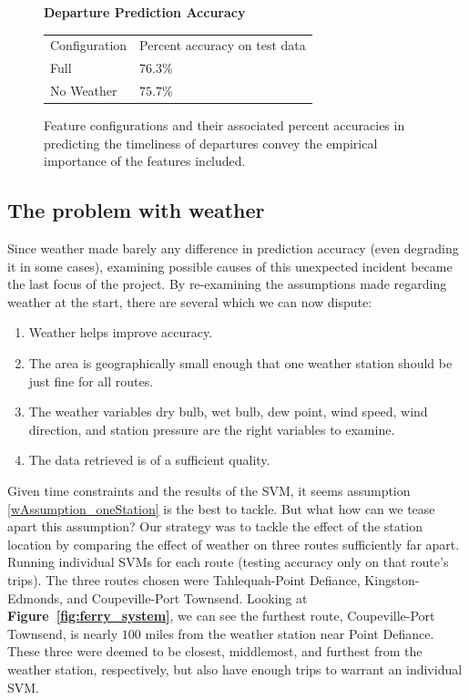 \documentclass[11pt]{article} %
\begin{document}
\begin{figure}
    \centering
    \textbf{Departure Prediction Accuracy}

    \begin{tabular}{ll}
        Configuration & Percent accuracy on test data\\
        Full        & $76.3\%$\\
        No Weather  & $75.7\%$\\
    \end{tabular}
    \caption{Feature configurations and their associated percent accuracies in
         predicting the timeliness of departures convey the empirical importance of 
         the features included.}
    \label{fig:second_run_data_departures}
\end{figure}

\subsection{The problem with weather}
\label{sec:weather_prob}
Since weather made barely any difference in prediction accuracy (even 
degrading it in some cases), examining possible causes of this unexpected 
incident became the last focus of the project. By re-examining the assumptions
made regarding weather at the start, there are several which we can now dispute:

\begin{enumerate}
    \item Weather helps improve accuracy.
    \item \label{wAssumption_oneStation} The area is geographically small enough 
        that one weather station should be just fine for all routes.
    \item The weather variables dry bulb, wet bulb, dew point, wind speed, 
        wind direction, and station pressure are the right variables to examine.
    \item The data retrieved is of a sufficient quality.
\end{enumerate}

Given time constraints and the results of the SVM, it seems assumption 
\ref{wAssumption_oneStation} is the best to tackle. But what how can we tease
apart this assumption? Our strategy was to tackle the effect of the station
location by comparing the effect of weather on three routes sufficiently far apart.
Running individual SVMs for each route (testing accuracy only on that route's 
trips). The three routes chosen were Tahlequah-Point Defiance, Kingston-Edmonds,
and Coupeville-Port Townsend. Looking at \textbf{Figure~\ref{fig:ferry_system}},
we can see the furthest route, Coupeville-Port Townsend, is nearly $100$ miles
from the weather station near Point Defiance. These three were deemed to be 
closest, middlemost, and furthest from the weather station, respectively, but also 
have enough trips to warrant an individual SVM. 
\end{document}
